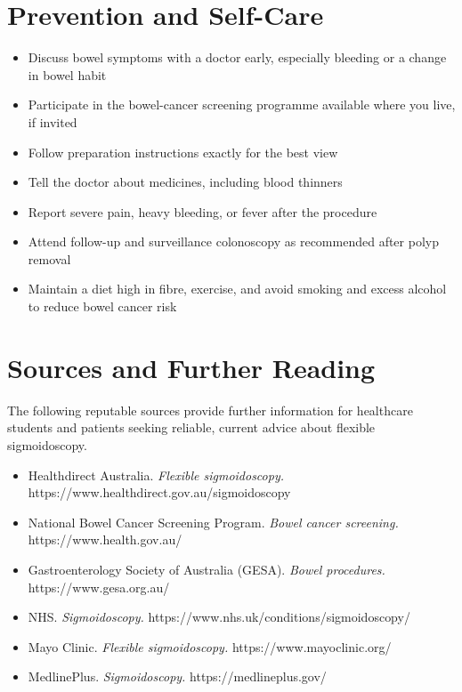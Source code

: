 \section*{Prevention and Self-Care}
\begin{itemize}
    \item Discuss bowel symptoms with a doctor early, especially bleeding or a change in bowel habit
    \item Participate in the bowel-cancer screening programme available where you live, if invited
    \item Follow preparation instructions exactly for the best view
    \item Tell the doctor about medicines, including blood thinners
    \item Report severe pain, heavy bleeding, or fever after the procedure
    \item Attend follow-up and surveillance colonoscopy as recommended after polyp removal
    \item Maintain a diet high in fibre, exercise, and avoid smoking and excess alcohol to reduce bowel cancer risk
\end{itemize}

\section*{Sources and Further Reading}
The following reputable sources provide further information for healthcare students and patients seeking reliable, current advice about flexible sigmoidoscopy.
\begin{itemize}
    \item Healthdirect Australia. \textit{Flexible sigmoidoscopy.} https://www.healthdirect.gov.au/sigmoidoscopy
    \item National Bowel Cancer Screening Program. \textit{Bowel cancer screening.} https://www.health.gov.au/
    \item Gastroenterology Society of Australia (GESA). \textit{Bowel procedures.} https://www.gesa.org.au/
    \item NHS. \textit{Sigmoidoscopy.} https://www.nhs.uk/conditions/sigmoidoscopy/
    \item Mayo Clinic. \textit{Flexible sigmoidoscopy.} https://www.mayoclinic.org/
    \item MedlinePlus. \textit{Sigmoidoscopy.} https://medlineplus.gov/
\end{itemize}
